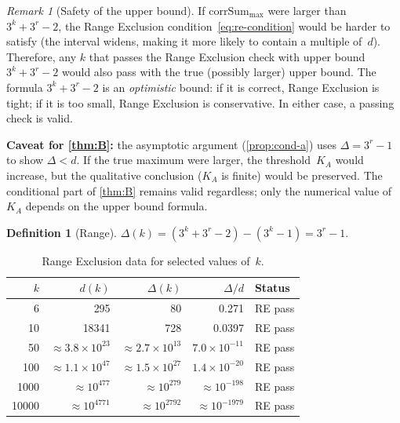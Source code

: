 \documentclass[11pt, a4paper]{amsart}
\theoremstyle{plain}
\theoremstyle{definition}
\newtheorem{definition}[theorem]{Definition}
\theoremstyle{remark}
\newtheorem{remark}[theorem]{Remark}
\newcommand{\corrSum}{\mathrm{corrSum}}
\begin{document}
\begin{remark}[Safety of the upper bound]\label{rem:upper-safe}
  If $\corrSum_{\max}$ were larger than $3^k + 3^r - 2$,
  the Range Exclusion condition~\eqref{eq:re-condition}
  would be harder to satisfy (the interval widens, making
  it more likely to contain a multiple of~$d$).
  Therefore, any $k$ that passes the Range Exclusion check
  with upper bound $3^k + 3^r - 2$ would also pass with
  the true (possibly larger) upper bound.
  The formula $3^k + 3^r - 2$ is an \emph{optimistic}
  bound: if it is correct, Range Exclusion is tight;
  if it is too small, Range Exclusion is conservative.
  In either case, a passing check is valid.

  \textbf{Caveat for \cref{thm:B}:} the asymptotic argument
  (\cref{prop:cond-a}) uses $\Delta = 3^r - 1$ to show
  $\Delta < d$.  If the true maximum were larger, the
  threshold~$K_A$ would increase, but the qualitative
  conclusion ($K_A$ is finite) would be preserved.
  The conditional part of \cref{thm:B} remains valid
  regardless; only the numerical value of~$K_A$ depends
  on the upper bound formula.
\end{remark}

\begin{definition}[Range]\label{def:range}
  $\Delta(k) = (3^k + 3^r - 2) - (3^k - 1) = 3^r - 1$.
\end{definition}

\begin{table}[ht]
\centering
\caption{Range Exclusion data for selected values of~$k$.}
\label{tab:ratio}
\begin{tabular}{rrrrl}
\toprule
$k$ & $d(k)$ & $\Delta(k)$ & $\Delta/d$ & Status \\
\midrule
6 & 295 & 80 & 0.271 & RE pass \\
10 & 18341 & 728 & 0.0397 & RE pass \\
50 & $\approx 3.8 \times 10^{23}$ & $\approx 2.7 \times 10^{13}$ & $7.0 \times 10^{-11}$ & RE pass \\
100 & $\approx 1.1 \times 10^{47}$ & $\approx 1.5 \times 10^{27}$ & $1.4 \times 10^{-20}$ & RE pass \\
1000 & $\approx 10^{477}$ & $\approx 10^{279}$ & $\approx 10^{-198}$ & RE pass \\
10000 & $\approx 10^{4771}$ & $\approx 10^{2792}$ & $\approx 10^{-1979}$ & RE pass \\
\bottomrule
\end{tabular}
\end{table}
\end{document}
